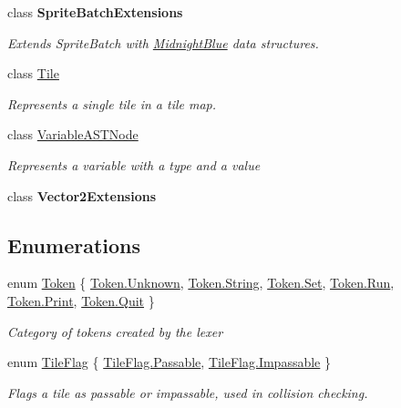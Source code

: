 \begin{DoxyCompactItemize}
class {\bfseries Sprite\+Batch\+Extensions}
\begin{DoxyCompactList}\small\item\em Extends Sprite\+Batch with \hyperlink{namespace_midnight_blue}{Midnight\+Blue} data structures. \end{DoxyCompactList}\item 
class \hyperlink{class_m_b2_d_1_1_tile}{Tile}
\begin{DoxyCompactList}\small\item\em Represents a single tile in a tile map. \end{DoxyCompactList}\item 
class \hyperlink{class_m_b2_d_1_1_variable_a_s_t_node}{Variable\+A\+S\+T\+Node}
\begin{DoxyCompactList}\small\item\em Represents a variable with a type and a value \end{DoxyCompactList}\item 
class {\bfseries Vector2\+Extensions}
\end{DoxyCompactItemize}
\subsection*{Enumerations}
\begin{DoxyCompactItemize}
\item 
enum \hyperlink{namespace_m_b2_d_ab170e7e7db86e5ccb0ae156c0d9a6002}{Token} \{ \newline
\hyperlink{namespace_m_b2_d_ab170e7e7db86e5ccb0ae156c0d9a6002a88183b946cc5f0e8c96b2e66e1c74a7e}{Token.\+Unknown}, 
\hyperlink{namespace_m_b2_d_ab170e7e7db86e5ccb0ae156c0d9a6002a27118326006d3829667a400ad23d5d98}{Token.\+String}, 
\hyperlink{namespace_m_b2_d_ab170e7e7db86e5ccb0ae156c0d9a6002a5d5b78699e57104f2fa03bbdf7b9197b}{Token.\+Set}, 
\hyperlink{namespace_m_b2_d_ab170e7e7db86e5ccb0ae156c0d9a6002ac5301693c4e792bcd5a479ef38fb8f8d}{Token.\+Run}, 
\newline
\hyperlink{namespace_m_b2_d_ab170e7e7db86e5ccb0ae156c0d9a6002a13dba24862cf9128167a59100e154c8d}{Token.\+Print}, 
\hyperlink{namespace_m_b2_d_ab170e7e7db86e5ccb0ae156c0d9a6002a0d82790b0612935992bd564a17ce37d6}{Token.\+Quit}
 \}\begin{DoxyCompactList}\small\item\em Category of tokens created by the lexer \end{DoxyCompactList}
\item 
enum \hyperlink{namespace_m_b2_d_a3ff821c2c17b424864d890d0b26536ea}{Tile\+Flag} \{ \hyperlink{namespace_m_b2_d_a3ff821c2c17b424864d890d0b26536eaa01bb7f8bb1804fb74130d34c8c977a99}{Tile\+Flag.\+Passable}, 
\hyperlink{namespace_m_b2_d_a3ff821c2c17b424864d890d0b26536eaa02518d4f54df131d84d3b77bcb2bdce4}{Tile\+Flag.\+Impassable}
 \}\begin{DoxyCompactList}\small\item\em Flags a tile as passable or impassable, used in collision checking. \end{DoxyCompactList}
\end{DoxyCompactItemize}


